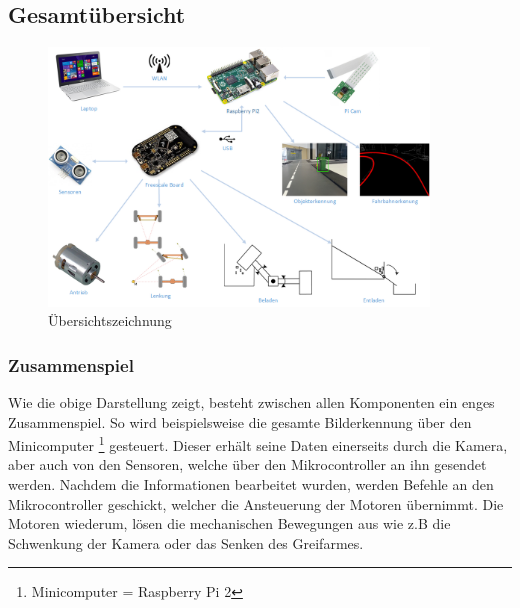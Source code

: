 \subsection{Gesamtübersicht}
\begin{figure}[H]%
\centering
\includegraphics[width=0.9\textwidth]{03_Loesungskonzept/pictures/uebersichtszeichnung.png}
\caption{Übersichtszeichnung}
\label{fig:Übersichtszeichnung}
\end{figure}
\subsubsection{Zusammenspiel}
Wie die obige Darstellung zeigt, besteht zwischen allen Komponenten ein enges Zusammenspiel. So wird beispielsweise die gesamte Bilderkennung über den Minicomputer \footnote{Minicomputer = Raspberry Pi 2} gesteuert. Dieser erhält seine Daten einerseits durch die Kamera, aber auch von den Sensoren, welche über den Mikrocontroller an ihn gesendet werden. Nachdem die Informationen bearbeitet wurden, werden Befehle an den Mikrocontroller geschickt, welcher die Ansteuerung der Motoren übernimmt. Die Motoren wiederum, lösen die mechanischen Bewegungen aus wie z.B die Schwenkung der Kamera oder das Senken des Greifarmes.
